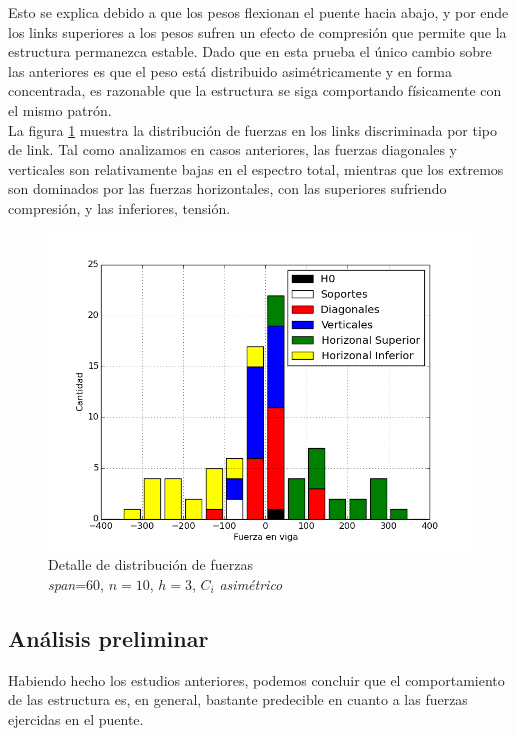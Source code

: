 Esto se explica debido a que los pesos flexionan el puente hacia abajo, y por ende los links superiores a los pesos sufren un efecto de compresión que permite que la estructura permanezca estable. Dado que en esta prueba el único cambio sobre las anteriores es que el peso está distribuido asimétricamente y en forma concentrada, es razonable que la estructura se siga comportando físicamente con el mismo patrón.\\

La figura \ref{fig:hist_asim} muestra la distribución de fuerzas en los links discriminada por tipo de link. Tal como analizamos en casos anteriores, las fuerzas diagonales y verticales son relativamente bajas en el espectro total, mientras que los extremos son dominados por las fuerzas horizontales, con las superiores sufriendo compresión, y las inferiores, tensión.

\begin{figure}[h!]
\begin{center}
\includegraphics[scale=0.5]{archivos/graficos/hist_asim.png}
\caption{\label{fig:hist_asim}Detalle de distribución de fuerzas\\
\textit{span}=$60$, $n=10$, $h=3$, $C_i$ \textit{asimétrico}}
\end{center}
\end{figure}

\subsection{Análisis preliminar}

Habiendo hecho los estudios anteriores, podemos concluir que el comportamiento de las estructura es, en general, bastante predecible en cuanto a las fuerzas ejercidas en el puente.\\

